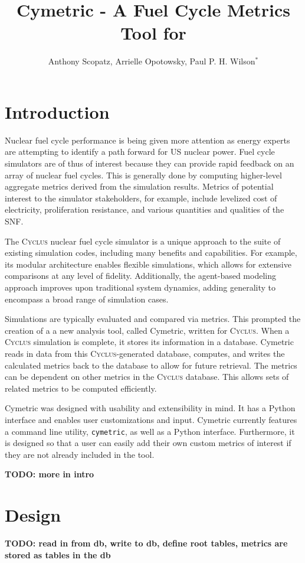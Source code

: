 \documentclass{anstrans}
\title{Cymetric - A Fuel Cycle Metrics Tool for \cyclus}
\author{Anthony Scopatz, Arrielle Opotowsky, Paul P. H. Wilson$^{*}$}
\institute{
$^{*}$Department of Engineering Physics, University of Wisconsin - Madison, 
1500 Engineering Drive, Madison WI 53703
}
\newcommand{\cyclus}{\textsc{Cyclus}\xspace}
\newcommand{\TODO}[1] {{\color{red}\textbf{TODO: #1}}}
\newcommand{\code}[1]{{\color{code}\texttt{#1}}}
\begin{document}
\section{Introduction}
Nuclear fuel cycle performance is being given more attention as energy 
experts are attempting to identify a path forward for \gls{US} nuclear power. 
Fuel cycle simulators are of thus of interest because they can provide rapid 
feedback on an array of nuclear fuel cycles. This is generally done by 
computing higher-level aggregate metrics derived from the simulation results. 
Metrics of potential interest to the simulator stakeholders, for example, 
include levelized cost of electricity, proliferation resistance, and various 
quantities and qualities of the \gls{SNF}.

The \cyclus nuclear fuel cycle simulator is a unique approach to the suite of 
existing simulation codes, including many benefits and capabilities.
For example, its modular architecture enables flexible simulations, which allows for extensive 
comparisons at any level of fidelity. Additionally, the agent-based modeling approach improves upon 
traditional system dynamics, adding generality to encompass a broad range of simulation cases. \cite{cyclus2015, cyclus_v1.2} 

Simulations are typically evaluated and compared via metrics. This 
prompted the creation of a
a new analysis tool, called Cymetric, written for \cyclus. When a \cyclus 
simulation is complete, it stores its information in a database. Cymetric 
reads in data from this \cyclus{}-generated database, computes, and writes 
the calculated metrics back to the database to allow for future retrieval. 
The metrics can be dependent on other metrics in the \cyclus database.
This allows sets of related metrics to be computed efficiently.

Cymetric was designed with usability and extensibility in mind. 
It has a Python interface and enables user customizations and input. 
Cymetric currently features a command line utility, \code{cymetric}, 
as well as a Python interface. Furthermore, it is designed so that a user can 
easily add their own custom metrics of interest if they are not already 
included in the tool. 

\TODO{more in intro}

\section{Design}
\TODO{ read in from db, write to db, define root tables, metrics are stored as tables in the db}
\end{document}

